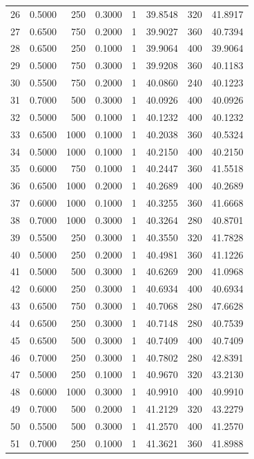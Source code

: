 \begin{tabular}{rrrrrrrr}
26 & 0.5000 & 250 & 0.3000 & 1 & 39.8548 & 320 & 41.8917 \\
27 & 0.6500 & 750 & 0.2000 & 1 & 39.9027 & 360 & 40.7394 \\
28 & 0.6500 & 250 & 0.1000 & 1 & 39.9064 & 400 & 39.9064 \\
29 & 0.5000 & 750 & 0.3000 & 1 & 39.9208 & 360 & 40.1183 \\
30 & 0.5500 & 750 & 0.2000 & 1 & 40.0860 & 240 & 40.1223 \\
31 & 0.7000 & 500 & 0.3000 & 1 & 40.0926 & 400 & 40.0926 \\
32 & 0.5000 & 500 & 0.1000 & 1 & 40.1232 & 400 & 40.1232 \\
33 & 0.6500 & 1000 & 0.1000 & 1 & 40.2038 & 360 & 40.5324 \\
34 & 0.5000 & 1000 & 0.1000 & 1 & 40.2150 & 400 & 40.2150 \\
35 & 0.6000 & 750 & 0.1000 & 1 & 40.2447 & 360 & 41.5518 \\
36 & 0.6500 & 1000 & 0.2000 & 1 & 40.2689 & 400 & 40.2689 \\
37 & 0.6000 & 1000 & 0.1000 & 1 & 40.3255 & 360 & 41.6668 \\
38 & 0.7000 & 1000 & 0.3000 & 1 & 40.3264 & 280 & 40.8701 \\
39 & 0.5500 & 250 & 0.3000 & 1 & 40.3550 & 320 & 41.7828 \\
40 & 0.5000 & 250 & 0.2000 & 1 & 40.4981 & 360 & 41.1226 \\
41 & 0.5000 & 500 & 0.3000 & 1 & 40.6269 & 200 & 41.0968 \\
42 & 0.6000 & 250 & 0.3000 & 1 & 40.6934 & 400 & 40.6934 \\
43 & 0.6500 & 750 & 0.3000 & 1 & 40.7068 & 280 & 47.6628 \\
44 & 0.6500 & 250 & 0.3000 & 1 & 40.7148 & 280 & 40.7539 \\
45 & 0.6500 & 500 & 0.3000 & 1 & 40.7409 & 400 & 40.7409 \\
46 & 0.7000 & 250 & 0.3000 & 1 & 40.7802 & 280 & 42.8391 \\
47 & 0.5000 & 250 & 0.1000 & 1 & 40.9670 & 320 & 43.2130 \\
48 & 0.6000 & 1000 & 0.3000 & 1 & 40.9910 & 400 & 40.9910 \\
49 & 0.7000 & 500 & 0.2000 & 1 & 41.2129 & 320 & 43.2279 \\
50 & 0.5500 & 500 & 0.3000 & 1 & 41.2570 & 400 & 41.2570 \\
51 & 0.7000 & 250 & 0.1000 & 1 & 41.3621 & 360 & 41.8988 \\

\end{tabular}

